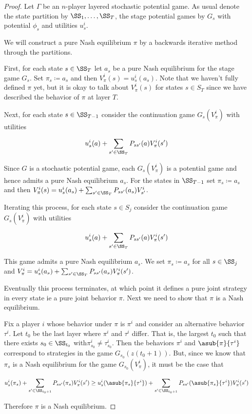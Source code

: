 \begin{proof}
Let $\Gamma$ be an $n$-player layered stochastic potential game. As usual denote the state partition by $\SS_1, \ldots, \SS_T$, the stage potential games by $G_s$ with potential $\phi_s$ and utilities $u^i_s$.

We will construct a pure Nash equilibrium $\pi$ by a backwards iterative method through the partitions.

First, for each state $s \in \SS_T$ let $a_s$ be a pure Nash equilibrium for the stage game $G_s$. Set $\pi_s \coloneq a_s$ and then $V^i_{\pi}(s) = u^i_s(a_s)$. Note that we haven't fully defined $\pi$ yet, but it is okay to talk about $V^i_{\pi}(s)$ for states $s \in S_T$ since we have described the behavior of $\pi$ at layer $T$.

Next, for each state $s \in \SS_{T-1}$ consider the continuation game $G_s(V^i_{\pi})$ with utilities

$$
u^i_s(a) + \sum_{s' \in \SS_{T}}P_{ss'}(a)V^i_{\pi}(s')
$$

Since $G$ is a stochastic potential game, each $G_s(V^i_{\pi})$ is a potential game and hence admits a pure Nash equilibrium $a_s$. For the states in $\SS_{T-1}$ set $\pi_s \coloneq a_s$ and then $V^i_{\pi}(s) = u^i_s(a_s) + \sum_{s' \in \SS_T}P_{ss'}(a_s)V^i_{s'}$.

Iterating this process, for each state $s \in S_j$ consider the continuation game $G_s(V^i_{\pi})$ with utilities

$$
u^i_s(a) + \sum_{s' \in \SS_{T}}P_{ss'}(a)V^i_{\pi}(s')
$$

This game admits a pure Nash equilibrium $a_s$. We set $\pi_s \coloneq a_s$ for all $s \in \SS_j$ and $V^i_{\pi} = u^i_s(a_s) + \sum_{s' \in \SS_T}P_{ss'}(a_s)V^i_{\pi}(s')$. 


Eventually this process terminates, at which point it defines a pure joint strategy in every state ie a pure joint behavior $\pi$. Next we need to show that $\pi$ is a Nash equilibrium.

Fix a player $i$ whose behavior under $\pi$ is $\pi^i$ and consider an alternative behavior $\tau^i$. Let $t_0$ be the last layer where $\pi^i$ and $\tau^i$ differ. That is, the largest $t_0$ such that there exists $s_0 \in \SS_{t_0}$ with$\pi^i_{s_0} \neq \tau^i_{s_0}$. Then the behaviors $\pi^i$ and $\asub{\pi}{\tau^i}$ correspond to strategies in the game $G_{s_0}(z(t_0+1))$. But, since we know that $\pi_s$ is a Nash equilibrium for the game $G_{s_0}(V^i_{\pi})$, it must be the case that

$$
u^i_s(\pi_s) + \sum_{s' \in \SS_{t_0+1}} P_{ss'}(\pi_s)V^i_{\pi}(s') \geq u^i_s(\asub{\pi_s}{\tau^i}) + \sum_{s' \in \SS_{t_0+1}} P_{ss'}(\asub{\pi_s}{\tau^i})V^i_{\pi}(s')
$$

Therefore $\pi$ is a Nash equilibrium.


\end{proof}

















